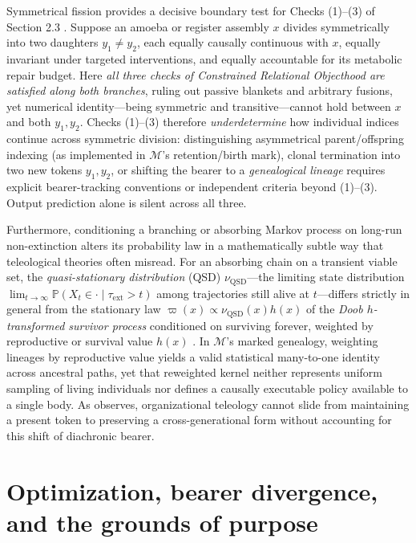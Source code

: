 \documentclass[11pt,a4paper]{article}
\begin{document}
Symmetrical fission provides a decisive boundary test for Checks
(1)--(3) of Section 2.3 \citep{parfit1984}. Suppose an amoeba or
register assembly \(x\) divides symmetrically into two daughters
\(y_1 \neq y_2\), each equally causally continuous with \(x\), equally
invariant under targeted interventions, and equally accountable for its
metabolic repair budget. Here \emph{all three checks of Constrained
Relational Objecthood are satisfied along both branches}, ruling out
passive blankets and arbitrary fusions, yet numerical identity---being
symmetric and transitive---cannot hold between \(x\) and both
\(y_1, y_2\). Checks (1)--(3) therefore \emph{underdetermine} how
individual indices continue across symmetric division: distinguishing
asymmetrical parent/offspring indexing (as implemented in
\(\mathcal{M}\)'s retention/birth mark), clonal termination into two new
tokens \(y_1, y_2\), or shifting the bearer to a \emph{genealogical
lineage} requires explicit bearer-tracking conventions or independent
criteria beyond (1)--(3). Output prediction alone is silent across all
three.

Furthermore, conditioning a branching or absorbing Markov process on
long-run non-extinction alters its probability law in a mathematically
subtle way that teleological theories often misread. For an absorbing
chain on a transient viable set, the \emph{quasi-stationary
distribution} (QSD) \(\nu_{\mathrm{QSD}}\)---the limiting state
distribution
\(\lim_{t\to\infty} \mathbb{P}(X_t \in \cdot \mid \tau_{\mathrm{ext}} > t)\)
among trajectories still alive at \(t\)---differs strictly in general
from the stationary law \(\varpi(x) \propto \nu_{\mathrm{QSD}}(x) h(x)\)
of the \emph{Doob \(h\)-transformed survivor process} conditioned on
surviving forever, weighted by reproductive or survival value \(h(x)\)
\citep{doob1957, darrochSeneta1965, collet2013}. In \(\mathcal{M}\)'s
marked genealogy, weighting lineages by reproductive value yields a
valid statistical many-to-one identity across ancestral paths, yet that
reweighted kernel neither represents uniform sampling of living
individuals nor defines a causally executable policy available to a
single body. As \citet{cuciniello2026} observes, organizational
teleology cannot slide from maintaining a present token to preserving a
cross-generational form without accounting for this shift of diachronic
bearer.

\section{Optimization, bearer divergence, and the grounds of
purpose}\label{optimization-bearer-divergence-and-the-grounds-of-purpose}
\end{document}
